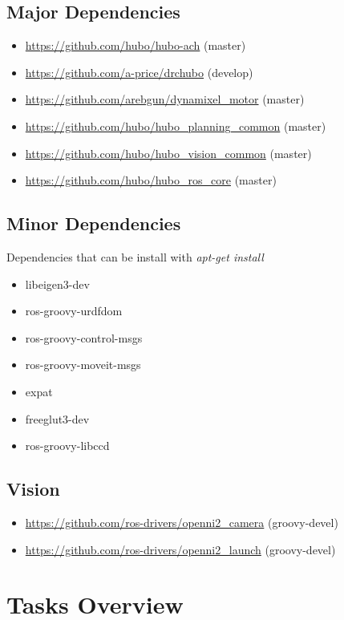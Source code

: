 \documentclass[letterpaper, 10 pt]{report}
\begin{document}
\section{Major Dependencies}
\begin{itemize}
  \item \url{https://github.com/hubo/hubo-ach} (master)
  \item \url{https://github.com/a-price/drchubo} (develop)
  \item \url{https://github.com/arebgun/dynamixel\_motor} (master)
  \item \url{https://github.com/hubo/hubo\_planning\_common} (master)
  \item \url{https://github.com/hubo/hubo\_vision\_common} (master)
  \item \url{https://github.com/hubo/hubo\_ros\_core} (master)
\end{itemize}
\section{Minor Dependencies}
Dependencies that can be install with \textit{apt-get install}
\begin{itemize}
  \item libeigen3-dev
  \item ros-groovy-urdfdom
  \item ros-groovy-control-msgs
  \item ros-groovy-moveit-msgs
  \item expat
  \item freeglut3-dev
  \item ros-groovy-libccd
\end{itemize}
\section{Vision}
\begin{itemize}
  \item \url{https://github.com/ros-drivers/openni2\_camera} (groovy-devel)
  \item \url{https://github.com/ros-drivers/openni2\_launch} (groovy-devel)
\end{itemize}
\newpage

%
\chapter{Tasks Overview}
\end{document}
